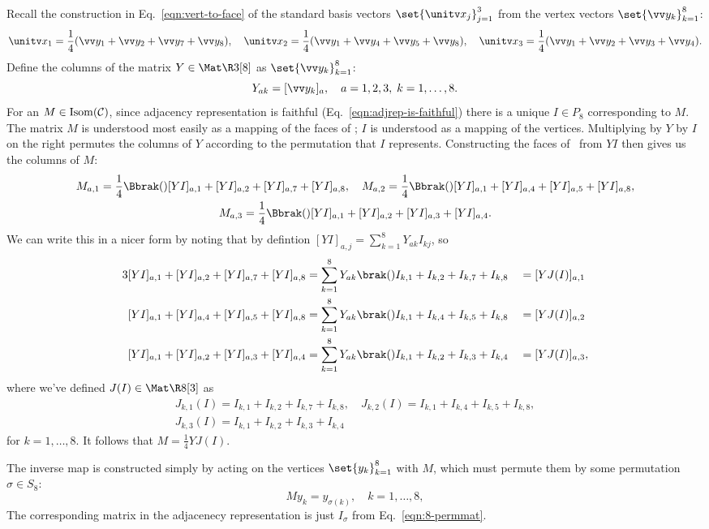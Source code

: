 Recall the construction in Eq.~\ref{eqn:vert-to-face} of the standard basis vectors
$\set{\unitv x_j}_{j=1}^3$ from the vertex vectors $\set{\vv y_k}_{k=1}^8$:
\[
\unitv x_1 = \frac14(\vv y_1+\vv y_2+\vv y_7+\vv y_8),\quad
\unitv x_2 = \frac14(\vv y_1+\vv y_4+\vv y_5+\vv y_8),\quad
\unitv x_3 = \frac14(\vv y_1+\vv y_2+\vv y_3+\vv y_4).
\]
Define the columns of the matrix $Y \in \Mat\R3[8]$ as $\set{\vv y_k}_{k=1}^8$:
\[ Y_{ak} = [\vv y_k]_a,\quad a=1,2,3,\; k=1,\dotsc,8. \]
For an $M \in \operatorname{Isom}(\mathcal C)$, since adjacency representation is faithful
(Eq.~\ref{eqn:adjrep-is-faithful}) there is a unique $I \in P_8$ corresponding to $M$. The matrix $M$ is understood most easily as a mapping of the faces of
\Cube; $I$ is understood as a mapping of the vertices. Multiplying by $Y$ by $I$ on the right
permutes the columns of $Y$ according to the permutation that $I$ represents. Constructing the
faces of \Cube\ from $YI$ then gives us the columns of $M$:
\begin{gather*}
M_{a,1} = \frac14\Bbrak(){[YI]_{a,1}+[YI]_{a,2}+[YI]_{a,7}+[YI]_{a,8}},\quad
M_{a,2} = \frac14\Bbrak(){[YI]_{a,1}+[YI]_{a,4}+[YI]_{a,5}+[YI]_{a,8}}, \\
M_{a,3} = \frac14\Bbrak(){[YI]_{a,1}+[YI]_{a,2}+[YI]_{a,3}+[YI]_{a,4}}.
\end{gather*}
We can write this in a nicer form by noting that by defintion $[YI]_{a,j} =
\sum_{k=1}^8Y_{ak}I_{kj}$, so
\begin{alignat*}3
[YI]_{a,1} + [YI]_{a,2} + [YI]_{a,7} + [YI]_{a,8}
 &= \sum_{k=1}^8Y_{ak}\brak(){I_{k,1} + I_{k,2} + I_{k,7} + I_{k,8}}
&&= [YJ(I)]_{a,1} \\
[YI]_{a,1} + [YI]_{a,4} + [YI]_{a,5} + [YI]_{a,8}
 &= \sum_{k=1}^8Y_{ak}\brak(){I_{k,1} + I_{k,4} + I_{k,5} + I_{k,8}}
&&= [YJ(I)]_{a,2} \\
[YI]_{a,1} + [YI]_{a,2} + [YI]_{a,3} + [YI]_{a,4}
 &= \sum_{k=1}^8Y_{ak}\brak(){I_{k,1} + I_{k,2} + I_{k,3} + I_{k,4}}
&&= [YJ(I)]_{a,3},
\end{alignat*}
where we've defined $J(I) \in \Mat\R8[3]$ as
\begin{gather*}
J_{k,1}(I) = I_{k,1} + I_{k,2} + I_{k,7} + I_{k,8},\quad
J_{k,2}(I) = I_{k,1} + I_{k,4} + I_{k,5} + I_{k,8}, \\
J_{k,3}(I) = I_{k,1} + I_{k,2} + I_{k,3} + I_{k,4}
\end{gather*}
for $k=1,\dotsc,8$. It follows that $M = \frac14YJ(I)$.

The inverse map is constructed simply by acting on the vertices $\set{y_k}_{k=1}^8$ with $M$,
which must permute them by some permutation $\sigma \in S_8$:
\[ My_k = y_{\sigma(k)},\quad k = 1,\dotsc,8, \]
The corresponding matrix in the adjacenecy representation is just $I_\sigma$ from
Eq.~\ref{eqn:8-permmat}.
